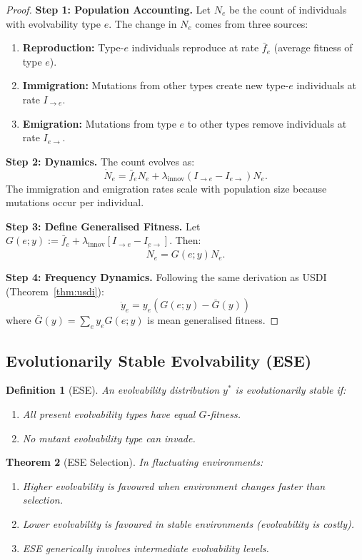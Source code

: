 \documentclass[12pt]{article}
\newtheorem{theorem}{Theorem}[section]
\newtheorem{definition}[theorem]{Definition}
\begin{document}
\begin{proof}
\textbf{Step 1: Population Accounting.}
Let $N_e$ be the count of individuals with evolvability type $e$. The change in $N_e$ comes from three sources:
\begin{enumerate}
    \item \textbf{Reproduction:} Type-$e$ individuals reproduce at rate $\bar{f}_e$ (average fitness of type $e$).
    \item \textbf{Immigration:} Mutations from other types create new type-$e$ individuals at rate $I_{\to e}$.
    \item \textbf{Emigration:} Mutations from type $e$ to other types remove individuals at rate $I_{e \to}$.
\end{enumerate}

\textbf{Step 2: Dynamics.}
The count evolves as:
\[
\dot{N}_e = \bar{f}_e N_e + \lambda_{\text{innov}} (I_{\to e} - I_{e \to}) N_e.
\]
The immigration and emigration rates scale with population size because mutations occur per individual.

\textbf{Step 3: Define Generalised Fitness.}
Let $G(e; y) := \bar{f}_e + \lambda_{\text{innov}}[I_{\to e} - I_{e \to}]$. Then:
\[
\dot{N}_e = G(e; y) N_e.
\]

\textbf{Step 4: Frequency Dynamics.}
Following the same derivation as USDI (Theorem~\ref{thm:usdi}):
\[
\dot{y}_e = y_e (G(e; y) - \bar{G}(y))
\]
where $\bar{G}(y) = \sum_e y_e G(e; y)$ is mean generalised fitness.
\end{proof}

\subsection{Evolutionarily Stable Evolvability (ESE)}

\begin{definition}[ESE]
An evolvability distribution $y^*$ is \emph{evolutionarily stable} if:
\begin{enumerate}
    \item All present evolvability types have equal $G$-fitness.
    \item No mutant evolvability type can invade.
\end{enumerate}
\end{definition}

\begin{theorem}[ESE Selection]
\label{thm:ese}
In fluctuating environments:
\begin{enumerate}
    \item[(a)] Higher evolvability is favoured when environment changes faster than selection.
    \item[(b)] Lower evolvability is favoured in stable environments (evolvability is costly).
    \item[(c)] ESE generically involves intermediate evolvability levels.
\end{enumerate}
\end{theorem}
\end{document}
